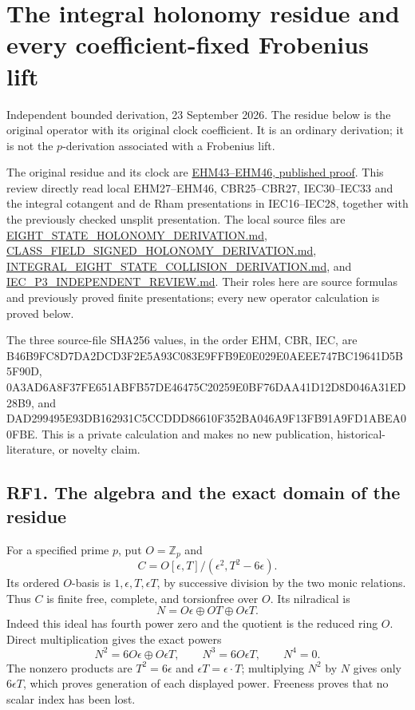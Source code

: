 \documentclass[
]{article}
\author{}
\date{}
\begin{document}
\section{The integral holonomy residue and every coefficient-fixed
Frobenius
lift}\label{the-integral-holonomy-residue-and-every-coefficient-fixed-frobenius-lift}

Independent bounded derivation, 23 September 2026. The residue below is
the original operator with its original clock coefficient. It is an
ordinary derivation; it is not the \(p\)-derivation associated with a
Frobenius lift.

The original residue and its clock are
\href{https://github.com/KokunoYumeto/zeta-function-research-reader/blob/adfbfe74fa49e31cb7aa068cf755fb083be37c32/workbenches/splitzero-tandem/branches/tau-zero-prime-positivity/EIGHT_STATE_HOLONOMY_DERIVATION.md\#L371}{EHM43--EHM46,
published proof}. This review directly read local EHM27--EHM46,
CBR25--CBR27, IEC30--IEC33 and the integral cotangent and de Rham
presentations in IEC16--IEC28, together with the previously checked
unsplit presentation. The local source files are
\url{EIGHT_STATE_HOLONOMY_DERIVATION.md},
\url{CLASS_FIELD_SIGNED_HOLONOMY_DERIVATION.md},
\url{INTEGRAL_EIGHT_STATE_COLLISION_DERIVATION.md}, and
\url{IEC_P3_INDEPENDENT_REVIEW.md}. Their roles here are source formulas
and previously proved finite presentations; every new operator
calculation is proved below.

The three source-file SHA256 values, in the order EHM, CBR, IEC, are
B46B9FC8D7DA2DCD3F2E5A93C083E9FFB9E0E029E0AEEE747BC19641D5B5F90D,
0A3AD6A8F37FE651ABFB57DE46475C20259E0BF76DAA41D12D8D046A31ED28B9, and
DAD299495E93DB162931C5CCDDD86610F352BA046A9F13FB91A9FD1ABEA00FBE. This
is a private calculation and makes no new publication,
historical-literature, or novelty claim.

\subsection{RF1. The algebra and the exact domain of the
residue}\label{rf1.-the-algebra-and-the-exact-domain-of-the-residue}

For a specified prime \(p\), put \(O=\mathbb Z_p\) and \[
C=O[\epsilon,T]/(\epsilon^2,T^2-6\epsilon).
\tag{RF1}
\] Its ordered \(O\)-basis is \(1,\epsilon,T,\epsilon T\), by successive
division by the two monic relations. Thus \(C\) is finite free,
complete, and torsionfree over \(O\). Its nilradical is \[
N=O\epsilon\oplus OT\oplus O\epsilon T.
\] Indeed this ideal has fourth power zero and the quotient is the
reduced ring \(O\). Direct multiplication gives the exact powers \[
N^2=6O\epsilon\oplus O\epsilon T,\qquad
N^3=6O\epsilon T,\qquad N^4=0.
\tag{RF2}
\] The nonzero products are \(T^2=6\epsilon\) and
\(\epsilon T=\epsilon\cdot T\); multiplying \(N^2\) by \(N\) gives only
\(6\epsilon T\), which proves generation of each displayed power.
Freeness proves that no scalar index has been lost.
\end{document}
